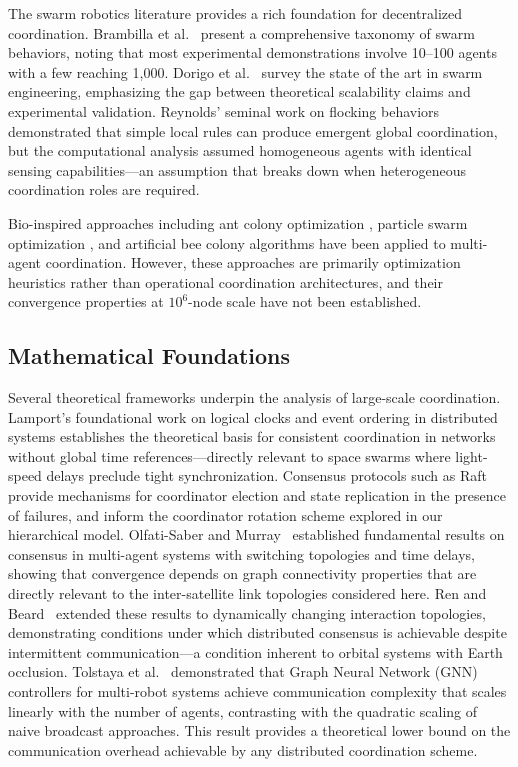 \documentclass[journal]{IEEEtran}
\begin{document}
The swarm robotics literature provides a rich foundation for decentralized coordination. Brambilla et al.~\cite{brambilla_2013} present a comprehensive taxonomy of swarm behaviors, noting that most experimental demonstrations involve 10--100 agents with a few reaching 1{,}000. Dorigo et al.~\cite{dorigo_2021} survey the state of the art in swarm engineering, emphasizing the gap between theoretical scalability claims and experimental validation. Reynolds' seminal work on flocking behaviors \cite{reynolds_1987} demonstrated that simple local rules can produce emergent global coordination, but the computational analysis assumed homogeneous agents with identical sensing capabilities---an assumption that breaks down when heterogeneous coordination roles are required.

Bio-inspired approaches including ant colony optimization \cite{dorigo_aco}, particle swarm optimization \cite{kennedy_pso}, and artificial bee colony algorithms \cite{karaboga_abc} have been applied to multi-agent coordination. However, these approaches are primarily optimization heuristics rather than operational coordination architectures, and their convergence properties at $10^6$-node scale have not been established.

\subsection{Mathematical Foundations}

Several theoretical frameworks underpin the analysis of large-scale coordination. Lamport's foundational work on logical clocks and event ordering in distributed systems \cite{lamport_clocks} establishes the theoretical basis for consistent coordination in networks without global time references---directly relevant to space swarms where light-speed delays preclude tight synchronization. Consensus protocols such as Raft \cite{ongaro_raft} provide mechanisms for coordinator election and state replication in the presence of failures, and inform the coordinator rotation scheme explored in our hierarchical model. Olfati-Saber and Murray~\cite{olfati_consensus} established fundamental results on consensus in multi-agent systems with switching topologies and time delays, showing that convergence depends on graph connectivity properties that are directly relevant to the inter-satellite link topologies considered here. Ren and Beard~\cite{ren_beard} extended these results to dynamically changing interaction topologies, demonstrating conditions under which distributed consensus is achievable despite intermittent communication---a condition inherent to orbital systems with Earth occlusion. Tolstaya et al.~\cite{tolstaya_gnn} demonstrated that Graph Neural Network (GNN) controllers for multi-robot systems achieve communication complexity that scales linearly with the number of agents, contrasting with the quadratic scaling of naive broadcast approaches. This result provides a theoretical lower bound on the communication overhead achievable by any distributed coordination scheme.
\end{document}
